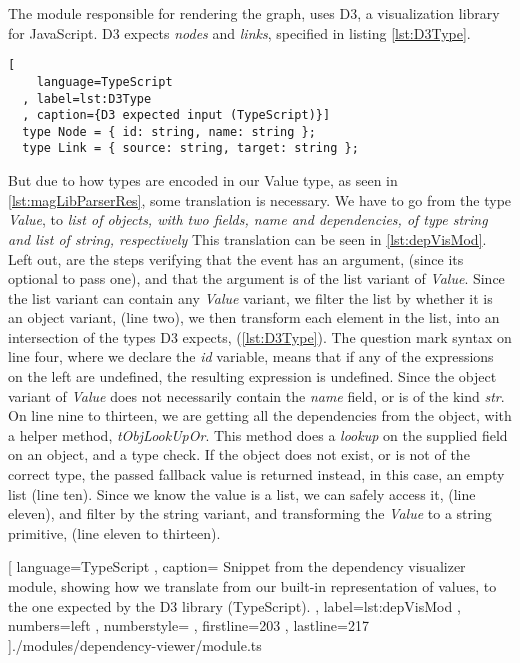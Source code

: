 The module responsible for rendering the graph, uses D3, a visualization library
for JavaScript. D3 expects \textit{nodes} and \textit{links}, specified in
listing \ref{lst:D3Type}.

\begin{lstlisting}[
    language=TypeScript
  , label=lst:D3Type
  , caption={D3 expected input (TypeScript)}]
  type Node = { id: string, name: string };
  type Link = { source: string, target: string };
\end{lstlisting}

But due to how types are encoded in our Value type, as seen in
\ref{lst:magLibParserRes}, some translation is necessary. We have to go from the
type \textit{Value}, to
\textit{
  list of objects, with two fields, name and dependencies, of type string and
  list of string, respectively}
This translation can be seen in \ref{lst:depVisMod}. Left out, are the steps
verifying that the event has an argument, (since its optional to pass one), and
that the argument is of the list variant of \textit{Value}. Since the list
variant can contain any \textit{Value} variant, we filter the list by whether it
is an object variant, (line two), we then transform each element in the list, into
an intersection of the types D3 expects, (\ref{lst:D3Type}). The question mark
syntax on line four, where we declare the \textit{id} variable, means that if any
of the expressions on the left are undefined, the resulting expression is
undefined. Since the object variant of \textit{Value} does not necessarily
contain the \textit{name} field, or is of the kind \textit{str}. On line nine to
thirteen, we are getting all the dependencies from the object, with a helper
method, \textit{tObjLookUpOr}. This method does a \textit{lookup} on the
supplied field on an object, and a type check. If the object does not exist, or
is not of the correct type, the passed fallback value is returned instead, in
this case, an empty list (line ten). Since we know the value is a list, we can
safely access it, (line eleven), and filter by the string variant, and
transforming the \textit{Value} to a string primitive, (line eleven to thirteen).

\begin{code}[H]
  
    [ language=TypeScript
    , caption={
      Snippet from the dependency visualizer module, showing how we translate
      from our built-in representation of values, to the one expected by the D3
      library (TypeScript).
    }
    , label=lst:depVisMod
    , numbers=left
    , numberstyle=\tiny\color{gray}
    , firstline=203
    , lastline=217
    ]{./modules/dependency-viewer/module.ts}
\end{code}


